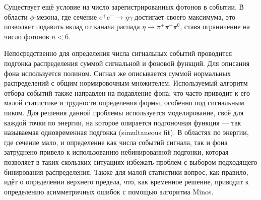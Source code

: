 Существует ещё условие на число зарегистрированных фотонов в событии.
В области $\phi$-мезона,
где сечение $e^+ e^- \to \eta \gamma$ достигает своего максимума,
это позволяет подавить вклад от канала распада $\eta \to \pi^+\pi^-\pi^0$,
ставя ограничение на число фотонов $n < 6$.

Непосредственно для определения числа сигнальных событий проводится подгонка распределения суммой сигнальной и фоновой функций.
Для описания фона используется полином.
Сигнал же описывается суммой нормальных распределений с общим нормировочным множителем.
Используемый алгоритм отбора событий также направлен на подавление фона,
что часто приводит к его малой статистике и трудности определения формы,
особенно под сигнальным пиком.
Для решения данной проблемы используется моделирование,
своё для каждой точки по энергии,
на которое опирается подгоночная функция --- так называемая одновременная подгонка (simultaneous fit).
В областях по энергии, где сечение мало,
и определение как числа событий сигнала,
так и фона затруднено привело к использованию небинированной подгонки,
которая позволяет в таких скользких ситуациях избежать проблем с выбором подходящего бинирования распределения.
Также для малой статистики вопрос, как правило,
идёт о определении верхнего предела, что, как временное решение,
приводит к определению асимметричных ошибок с помощью алгоритма Minos.